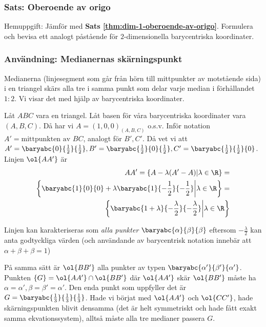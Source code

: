 

\subsubsection{Sats: Oberoende av origo}
Hemuppgift: Jämför med \textbf{Sats \ref{thm:dim-1-oberoende-av-origo}}.
Formulera och bevisa ett analogt påstående för $2$-dimensionella barycentriska koordinater.

\subsubsection{Användning: Medianernas skärningspunkt}
Medianerna (linjesegment som går från hörn till mittpunkter av motstående sida)
i en triangel skärs alla tre i samma punkt som delar varje median i förhållandet $1:2$. Vi visar det med
hjälp av barycentriska koordinater.

Låt $ABC$ vara en triangel. Låt basen för våra barycentriska koordinater vara $(A, B, C)$.
Då har vi $A = (1, 0, 0)_{(A,B,C)}$ o.s.v. 
Inför notation $A' = \text{mittpunkten av } BC$, analogt för $B', C'$.
Då vet vi att $A' = \baryabc{0} {\frac{1}{2}} {\frac{1}{2}}, 
    B' = \baryabc{\frac{1}{2}} {0} {\frac{1}{2}},
    C' = \baryabc{\frac{1}{2}} {\frac{1}{2}} {0}$.
Linjen $\ol{AA'}$ är
\begin{eqnarray*}
    AA' = \{A - \lambda (A'-A)| \lambda \in \R\} = \\
    \left\{ 
    \baryabc{1}{0}{0} + \lambda \baryabc{1} {-\frac{1}{2}} {-\frac{1}{2}}
    \bigg| \lambda \in \R
    \right\} = \\
    \left\{ 
    \baryabc{1 + \lambda } {-\frac{\lambda}{2} } {-\frac{\lambda}{2}}
    \bigg| \lambda \in \R
    \right\}
\end{eqnarray*}

Linjen kan karakteriseras som \textit{alla punkter $\baryabc{\alpha}{\beta}{\beta}$}
eftersom $-\frac{\lambda}{2}$ kan anta godtyckliga värden (och användande av barycentrisk
notation innebär att $\alpha + \beta + \beta = 1$)

På samma sätt är $\ol{BB'}$ alla punkter av typen $\baryabc{\alpha'}{\beta'}{\alpha'}$.
Punkten $\{G\} = \ol{AA'} \cap \ol{BB'}$ där $\ol{AA'}$ skär $\ol{BB'}$ måste ha 
$\alpha = \alpha', \beta = \beta' = \alpha'$.
Den enda punkt som uppfyller det är $G= \baryabc{\frac{1}{3}} {\frac{1}{3}} {\frac{1}{3}}$.
Hade vi börjat med $\ol{AA'}$ och $\ol{CC'}$, hade skärningspunkten blivit
densamma (det är helt symmetriskt och hade fått exakt samma ekvationssystem),
alltså måste alla tre medianer passera $G$.

